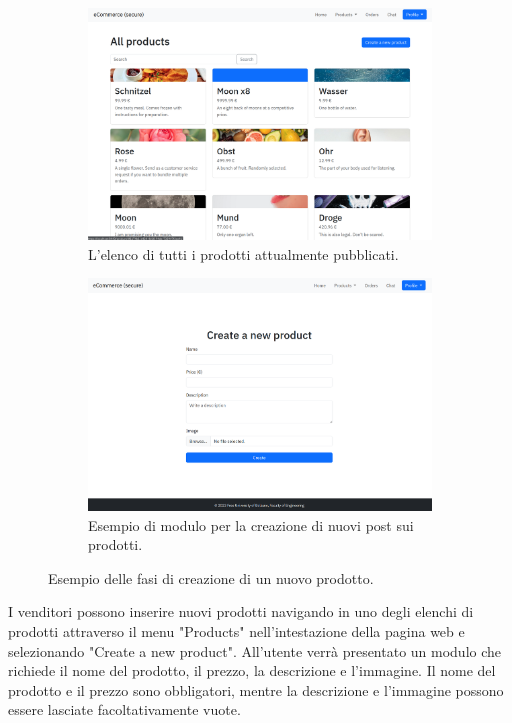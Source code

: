 \documentclass[conference,onecolumn,a4paper]{IEEEtran}
\begin{document}
\begin{figure}[H]
    \centering
    \begin{subfigure}[b]{0.4\linewidth}
        \includegraphics[width=\linewidth]{resources/products.png}
        \caption{L'elenco di tutti i prodotti attualmente pubblicati.}
    \end{subfigure}
    \begin{subfigure}[b]{0.4\linewidth}
        \includegraphics[width=\linewidth]{resources/new-product.png}
        \caption{Esempio di modulo per la creazione di nuovi post sui prodotti.}
    \end{subfigure}
    \caption{Esempio delle fasi di creazione di un nuovo prodotto.}
\end{figure}

I venditori possono inserire nuovi prodotti navigando in uno degli elenchi di prodotti attraverso il menu "Products" nell'intestazione della pagina web e selezionando "Create a new product". All'utente verrà presentato un modulo che richiede il nome del prodotto, il prezzo, la descrizione e l'immagine. Il nome del prodotto e il prezzo sono obbligatori, mentre la descrizione e l'immagine possono essere lasciate facoltativamente vuote.
\end{document}
